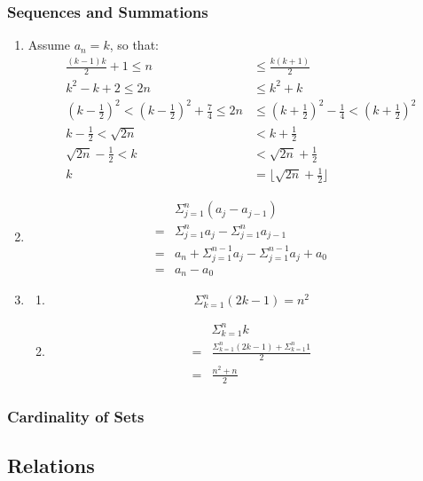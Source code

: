 \documentclass{sig-alternate-05-2015}
\begin{document}
\subsubsection{Sequences and Summations}
\begin{enumerate}
\item Assume $a_n = k$, so that:
\begin{align}
	\frac{(k - 1)k}{2} + 1 \le n & \le \frac{k(k + 1)}{2}\\
	k^2 - k + 2 \le 2n & \le k^2 + k\\
	(k - \frac{1}{2})^2 < (k - \frac{1}{2})^2 + \frac{7}{4} \le 2n & \le (k + \frac{1}{2})^2 - \frac{1}{4} < (k + \frac{1}{2})^2\\
	k - \frac{1}{2} < \sqrt{2n} & < k + \frac{1}{2}\\
	\sqrt{2n} - \frac{1}{2} < k & < \sqrt{2n} + \frac{1}{2}\\
	k & = \lfloor \sqrt{2n} + \frac{1}{2} \rfloor
\end{align}

\item 
\begin{align}
	& \Sigma^n_{j = 1}(a_j - a_{j - 1})\\
	= & \Sigma^n_{j = 1}a_j - \Sigma^n_{j = 1}a_{j - 1}\\
	= & a_n + \Sigma^{n - 1}_{j = 1}a_j - \Sigma^{n - 1}_{j = 1}a_j + a_0\\
	= & a_n - a_0
\end{align}

\item 
\begin{enumerate}
	\item 
	\begin{equation}
		\Sigma^n_{k = 1}(2k - 1) = n^2
	\end{equation}
	
	\item 
	\begin{align}
		& \Sigma^n_{k = 1} k\\
		= & \frac{\Sigma^n_{k = 1}(2k - 1) + \Sigma^n_{k = 1} 1}{2}\\
		= & \frac{n^2 + n}{2}
	\end{align}
\end{enumerate}
\end{enumerate}
\subsubsection{Cardinality of Sets}
\subsection{Relations}
\end{document}

